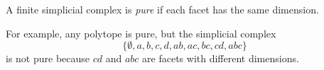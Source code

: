 \documentclass[12pt]{article}
\begin{document}
A finite simplicial complex is \emph{pure} if each facet has the same dimension.  

For example, any polytope is pure, but the simplicial complex
\[\{\emptyset, a, b, c, d, ab, ac, bc, cd, abc\}\]
is not pure because $cd$ and $abc$ are facets with different dimensions.
\end{document}
